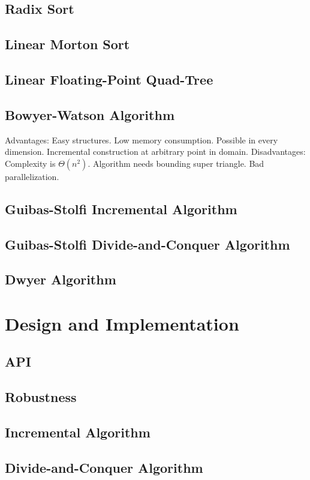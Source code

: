 \documentclass[10pt, twoside, fleqn]{article}
\let\oldsection\section
\renewcommand*\section{%
  \cleardoublepage
  \thispagestyle{sectionstyle}\oldsection}
\begin{document}
    \subsection{Radix Sort}
    \subsection{Linear Morton Sort}
    \subsection{Linear Floating-Point Quad-Tree}
    \subsection{Bowyer-Watson Algorithm}
      Advantages: Easy structures. Low memory consumption. Possible in every dimension. Incremental construction at arbitrary point in domain.
      Disadvantages: Complexity is $\Theta\left( n^2 \right)$. Algorithm needs bounding super triangle. Bad parallelization.
    \subsection{Guibas-Stolfi Incremental Algorithm}
    \subsection{Guibas-Stolfi Divide-and-Conquer Algorithm}
    \subsection{Dwyer Algorithm}
  \section{Design and Implementation}
    \subsection{API}
    \subsection{Robustness}
    \subsection{Incremental Algorithm}
    \subsection{Divide-and-Conquer Algorithm}
\end{document}
